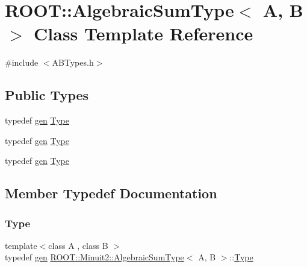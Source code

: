 \hypertarget{classROOT_1_1Minuit2_1_1AlgebraicSumType}{}\section{R\+O\+OT\+:\+:Algebraic\+Sum\+Type$<$ A, B $>$ Class Template Reference}
\label{classROOT_1_1Minuit2_1_1AlgebraicSumType}


{\ttfamily \#include $<$A\+B\+Types.\+h$>$}

\subsection*{Public Types}
\begin{DoxyCompactItemize}
\item 
typedef \mbox{\hyperlink{classROOT_1_1Minuit2_1_1gen}{gen}} \mbox{\hyperlink{classROOT_1_1Minuit2_1_1AlgebraicSumType_a9bf43a13ee66f334fb43c489c5bfa2e5}{Type}}
\item 
typedef \mbox{\hyperlink{classROOT_1_1Minuit2_1_1gen}{gen}} \mbox{\hyperlink{classROOT_1_1Minuit2_1_1AlgebraicSumType_a9bf43a13ee66f334fb43c489c5bfa2e5}{Type}}
\item 
typedef \mbox{\hyperlink{classROOT_1_1Minuit2_1_1gen}{gen}} \mbox{\hyperlink{classROOT_1_1Minuit2_1_1AlgebraicSumType_a9bf43a13ee66f334fb43c489c5bfa2e5}{Type}}
\end{DoxyCompactItemize}


\subsection{Member Typedef Documentation}
\mbox{\label{classROOT_1_1Minuit2_1_1AlgebraicSumType_a9bf43a13ee66f334fb43c489c5bfa2e5}} 
\subsubsection{\texorpdfstring{Type}{Type}\hspace{0.1cm}{\footnotesize\ttfamily [1/3]}}
{\footnotesize\ttfamily template$<$class A , class B $>$ \\
typedef \mbox{\hyperlink{classROOT_1_1Minuit2_1_1gen}{gen}} \mbox{\hyperlink{classROOT_1_1Minuit2_1_1AlgebraicSumType}{R\+O\+O\+T\+::\+Minuit2\+::\+Algebraic\+Sum\+Type}}$<$ A, B $>$\+::\mbox{\hyperlink{classROOT_1_1Minuit2_1_1AlgebraicSumType_a9bf43a13ee66f334fb43c489c5bfa2e5}{Type}}}

